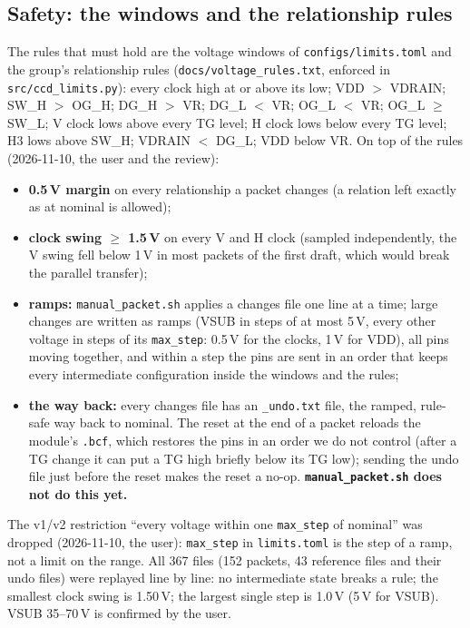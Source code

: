 \documentclass[11pt]{article}
\begin{document}
\subsection{Safety: the windows and the relationship rules}
The rules that must hold are the voltage windows of \texttt{configs/limits.toml} and the group's relationship rules
(\texttt{docs/voltage\_rules.txt}, enforced in \texttt{src/ccd\_limits.py}): every clock high at or above its low;
VDD $>$ VDRAIN; SW\_H $>$ OG\_H; DG\_H $>$ VR; DG\_L $<$ VR; OG\_L $<$ VR; OG\_L $\geq$ SW\_L; V clock lows above every TG
level; H clock lows below every TG level; H3 lows above SW\_H; VDRAIN $<$ DG\_L; VDD below VR. On top of the rules
(2026-11-10, the user and the review):
\begin{itemize}
\item \textbf{0.5\,V margin} on every relationship a packet changes (a relation left exactly as at nominal is allowed);
\item \textbf{clock swing $\geq$ 1.5\,V} on every V and H clock (sampled independently, the V swing fell below 1\,V in
  most packets of the first draft, which would break the parallel transfer);
\item \textbf{ramps:} \texttt{manual\_packet.sh} applies a changes file one line at a time; large changes are written as
  ramps (VSUB in steps of at most 5\,V, every other voltage in steps of its \texttt{max\_step}: 0.5\,V for the clocks,
  1\,V for VDD), all pins moving together, and within a step the pins are sent in an order that keeps every intermediate
  configuration inside the windows and the rules;
\item \textbf{the way back:} every changes file has an \texttt{\_undo.txt} file, the ramped, rule-safe way back to
  nominal. The reset at the end of a packet reloads the module's \texttt{.bcf}, which restores the pins in an order we do
  not control (after a TG change it can put a TG high briefly below its TG low); sending the undo file just before the
  reset makes the reset a no-op. \textbf{\texttt{manual\_packet.sh} does not do this yet.}
\end{itemize}
The v1/v2 restriction ``every voltage within one \texttt{max\_step} of nominal'' was dropped (2026-11-10, the user):
\texttt{max\_step} in \texttt{limits.toml} is the step of a ramp, not a limit on the range. All 367 files (152 packets,
43 reference files and their undo files) were replayed line by line: no intermediate state breaks a rule; the smallest
clock swing is 1.50\,V; the largest single step is 1.0\,V (5\,V for VSUB). VSUB 35--70\,V is confirmed by the user.
\end{document}
